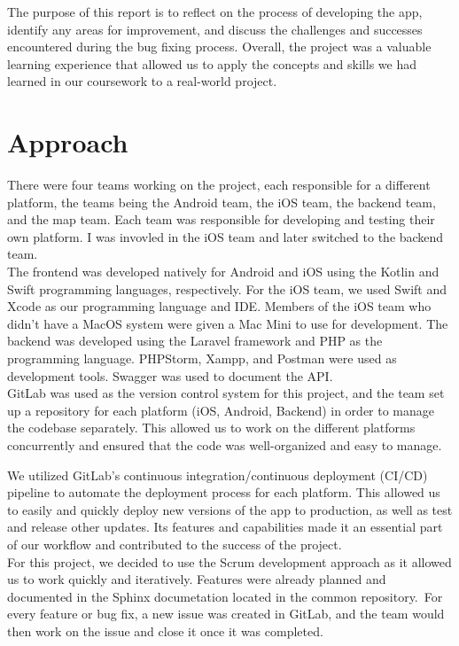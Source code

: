 \documentclass[sf-font,usefira,english]{uulm/sp/article}
\begin{document}
The purpose of this report is to reflect on the process 
of developing the app, identify any areas for improvement, 
and discuss the challenges and successes encountered during the bug fixing process.
Overall, the project was a valuable learning experience that allowed us to 
apply the concepts and skills we had learned in our coursework to a real-world project. \\

\section{Approach}

There were four teams working on the project, each responsible for a different platform,
the teams being the Android team, the iOS team, the backend team, and the map team.
Each team was responsible for developing and testing their own platform.
I was invovled in the iOS team and later switched to the backend team.\\

The frontend was developed natively for Android and iOS using the Kotlin and Swift programming languages, respectively.
For the iOS team, we used Swift and Xcode as our programming language and IDE.
Members of the iOS team who didn't have a MacOS system were given a Mac Mini to use for development.
The backend was developed using the Laravel framework and PHP as the programming language.
PHPStorm, Xampp, and Postman were used as development tools.
Swagger was used to document the API.\\

GitLab was used as the version control system for this project, 
and the team set up a repository for each platform (iOS, Android, Backend) 
in order to manage the codebase separately. 
This allowed us to work on the different platforms concurrently 
and ensured that the code was well-organized and easy to manage.\

We utilized GitLab's continuous integration/continuous deployment (CI/CD) 
pipeline to automate the deployment process for each platform. 
This allowed us to easily and quickly deploy new versions of the app to production, 
as well as test and release other updates.
Its features and capabilities made it an essential part of our workflow 
and contributed to the success of the project.\\

For this project, we decided to use the Scrum development approach 
as it allowed us to work quickly and iteratively.
Features were already planned and documented in the Sphinx documetation located 
in the common repository.\
For every feature or bug fix, a new issue was created in GitLab,
and the team would then work on the issue and close it once it was completed.\\
\end{document}
